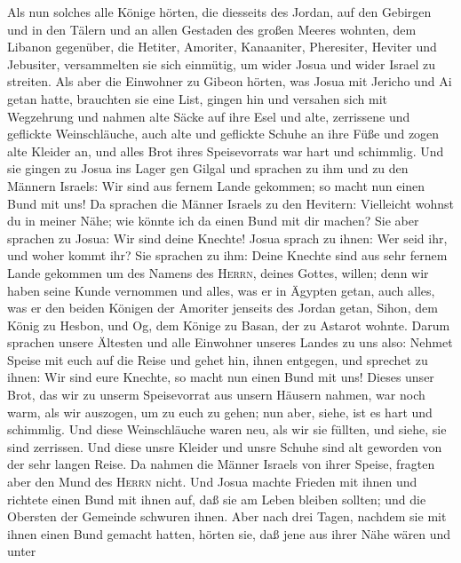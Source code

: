  Als nun solches alle Könige hörten, die diesseits des
Jordan, auf den Gebirgen und in den Tälern und an allen Gestaden des
großen Meeres wohnten, dem Libanon gegenüber, die Hetiter, Amoriter,
Kanaaniter, Pheresiter, Heviter und Jebusiter, 
versammelten sie sich einmütig, um wider Josua und wider Israel zu
streiten.  Als aber die Einwohner zu Gibeon hörten, was
Josua mit Jericho und Ai getan hatte, brauchten sie eine List,
 gingen hin und versahen sich mit Wegzehrung und nahmen
alte Säcke auf ihre Esel und alte, zerrissene und geflickte
Weinschläuche,  auch alte und geflickte Schuhe an ihre
Füße und zogen alte Kleider an, und alles Brot ihres Speisevorrats war
hart und schimmlig.  Und sie gingen zu Josua ins Lager gen
Gilgal und sprachen zu ihm und zu den Männern Israels: Wir sind aus
fernem Lande gekommen; so macht nun einen Bund mit uns! 
Da sprachen die Männer Israels zu den Hevitern: Vielleicht wohnst du in
meiner Nähe; wie könnte ich da einen Bund mit dir machen? 
Sie aber sprachen zu Josua: Wir sind deine Knechte! Josua sprach zu
ihnen: Wer seid ihr, und woher kommt ihr?  Sie sprachen zu
ihm: Deine Knechte sind aus sehr fernem Lande gekommen um des Namens des
\textsc{Herrn}, deines Gottes, willen; denn wir haben seine Kunde
vernommen und alles, was er in Ägypten getan,  auch
alles, was er den beiden Königen der Amoriter jenseits des Jordan getan,
Sihon, dem König zu Hesbon, und Og, dem Könige zu Basan, der zu Astarot
wohnte.  Darum sprachen unsere Ältesten und alle
Einwohner unseres Landes zu uns also: Nehmet Speise mit euch auf die
Reise und gehet hin, ihnen entgegen, und sprechet zu ihnen: Wir sind
eure Knechte, so macht nun einen Bund mit uns!  Dieses
unser Brot, das wir zu unserm Speisevorrat aus unsern Häusern nahmen,
war noch warm, als wir auszogen, um zu euch zu gehen; nun aber, siehe,
ist es hart und schimmlig.  Und diese Weinschläuche waren
neu, als wir sie füllten, und siehe, sie sind zerrissen. Und diese unsre
Kleider und unsre Schuhe sind alt geworden von der sehr langen Reise.
 Da nahmen die Männer Israels von ihrer Speise, fragten
aber den Mund des \textsc{Herrn} nicht.  Und Josua machte
Frieden mit ihnen und richtete einen Bund mit ihnen auf, daß sie am
Leben bleiben sollten; und die Obersten der Gemeinde schwuren ihnen.
 Aber nach drei Tagen, nachdem sie mit ihnen einen Bund
gemacht hatten, hörten sie, daß jene aus ihrer Nähe wären und unter
